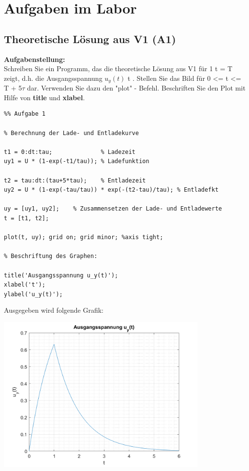 \chapter{Aufgaben im Labor}
\thispagestyle{fancy}

\section{Theoretische Lösung aus V1 (A1)}

\textbf{Aufgabenstellung:\\}
Schreiben Sie ein Programm, das die theoretische Lösung aus V1 für 1 t = T zeigt, d.h. die Ausgangsspannung $u_y(t)$ t . Stellen Sie das Bild für 0 <= t <= T + 5$\tau$ dar. Verwenden Sie dazu den "plot" - Befehl. Beschriften Sie den Plot mit Hilfe von \textbf{title} und \textbf{xlabel}.

\vspace{1.5cm}

\begin{lstlisting}
%% Aufgabe 1

% Berechnung der Lade- und Entladekurve

t1 = 0:dt:tau;              % Ladezeit
uy1 = U * (1-exp(-t1/tau)); % Ladefunktion

t2 = tau:dt:(tau+5*tau);    % Entladezeit
uy2 = U * (1-exp(-tau/tau)) * exp(-(t2-tau)/tau); % Entladefkt

uy = [uy1, uy2];    % Zusammensetzen der Lade- und Entladewerte
t = [t1, t2];

plot(t, uy); grid on; grid minor; %axis tight; 

% Beschriftung des Graphen:

title('Ausgangsspannung u_y(t)');
xlabel('t');
ylabel('u_y(t)');

\end{lstlisting}

\vspace{0.5cm}

\newpage
    
    
Ausgegeben wird folgende Grafik:
\begin{center}
\includegraphics[width=300pt]{img/aufgabe1.png}
\end{center}

